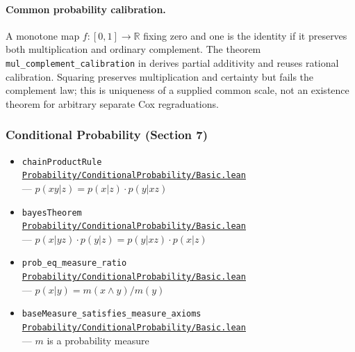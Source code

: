 \documentclass[11pt]{article}
\theoremstyle{definition}
\theoremstyle{remark}
\begin{document}
\paragraph{Common probability calibration.}
A monotone map $f:[0,1]\to\mathbb{R}$ fixing zero and one is the identity
if it preserves both multiplication and ordinary complement. The theorem
\texttt{mul\_complement\_calibration} in
 derives partial additivity
and reuses rational calibration. Squaring preserves multiplication and certainty
but fails the complement law; this is uniqueness of a supplied common scale,
not an existence theorem for arbitrary separate Cox regraduations.

\subsubsection*{Conditional Probability (Section 7)}
\begin{itemize}
\item \texttt{chainProductRule}\\
      \href{https://github.com/zariuq/ks-foundations-of-inference/blob/main/KnuthSkilling/Probability/ConditionalProbability/Basic.lean}{\texttt{Probability/ConditionalProbability/Basic.lean}}\\
      --- $p(xy|z) = p(x|z) \cdot p(y|xz)$
\item \texttt{bayesTheorem}\\
      \href{https://github.com/zariuq/ks-foundations-of-inference/blob/main/KnuthSkilling/Probability/ConditionalProbability/Basic.lean}{\texttt{Probability/ConditionalProbability/Basic.lean}}\\
      --- $p(x|yz) \cdot p(y|z) = p(y|xz) \cdot p(x|z)$
\item \texttt{prob\_eq\_measure\_ratio}\\
      \href{https://github.com/zariuq/ks-foundations-of-inference/blob/main/KnuthSkilling/Probability/ConditionalProbability/Basic.lean}{\texttt{Probability/ConditionalProbability/Basic.lean}}\\
      --- $p(x|y) = m(x \wedge y) / m(y)$
\item \texttt{baseMeasure\_satisfies\_measure\_axioms}\\
      \href{https://github.com/zariuq/ks-foundations-of-inference/blob/main/KnuthSkilling/Probability/ConditionalProbability/Basic.lean}{\texttt{Probability/ConditionalProbability/Basic.lean}}\\
      --- $m$ is a probability measure
\end{itemize}
\end{document}
